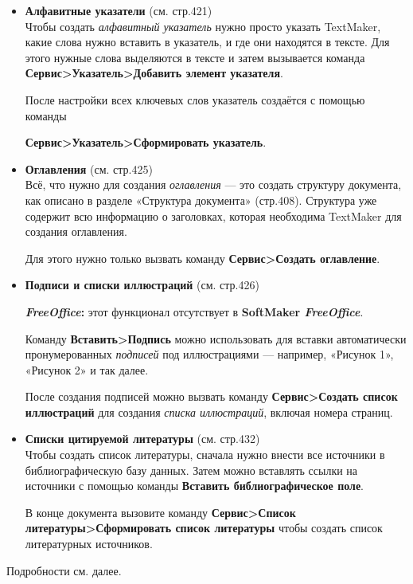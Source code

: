 ﻿\documentclass[a4paper,10pt]{article}
\begin{document}
\begin{itemize}
 \item \textbf{Алфавитные указатели} (см. стр.421)\\
 Чтобы создать \textit{алфавитный указатель} нужно просто указать TextMaker, какие слова нужно вставить в указатель, и где они находятся в тексте. Для этого нужные слова выделяются в тексте и затем вызывается команда \textbf{Сервис>Указатель>Добавить элемент указателя}.
 
 После настройки всех ключевых слов указатель создаётся с помощью команды 
 
 \textbf{Сервис>Указатель>Сформировать указатель}.
 \item \textbf{Оглавления} (см. стр.425)\\
 Всё, что нужно для создания \textit{оглавления} — это создать структуру документа, как описано в разделе «Структура документа» (стр.408). Структура уже содержит всю информацию о заголовках, которая необходима TextMaker для создания оглавления.
 
 Для этого нужно только вызвать команду \textbf{Сервис>Создать оглавление}.
 \item \textbf{Подписи и списки иллюстраций} (см. стр.426)\\
 \begin{mdframed}[backgroundcolor=pink!50]
\textbf{\textit{FreeOffice}:} этот функционал отсутствует в \textbf{SoftMaker \textit{FreeOffice}}.
\end{mdframed}

Команду \textbf{Вставить>Подпись} можно использовать для вставки автоматически пронумерованных \textit{подписей} под иллюстрациями — например, «Рисунок 1», «Рисунок 2» и так далее.

После создания подписей можно вызвать команду \textbf{Сервис>Создать список иллюстраций} для создания \textit{списка иллюстраций}, включая номера страниц.
\item \textbf{Списки цитируемой литературы} (см. стр.432)\\
Чтобы создать список литературы, сначала нужно внести все источники в библиографическую базу данных. Затем можно вставлять ссылки на источники с помощью команды \textbf{Вставить библиографическое поле}.

В конце документа вызовите команду \textbf{Сервис>Список литературы>Сформировать список литературы} чтобы создать список литературных источников.
\end{itemize}

Подробности см. далее.
\end{document}
